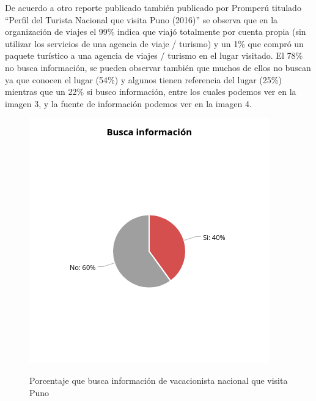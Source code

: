 De acuerdo a otro reporte publicado también publicado por Promperú titulado “Perfil del Turista Nacional que visita Puno (2016)” se observa que en la organización de viajes el 99\% indica que viajó totalmente por cuenta propia (sin utilizar los servicios de una agencia de viaje / turismo) y un 1\% que compró un paquete turístico a una agencia de viajes / turismo en el lugar visitado. El 78\% no busca información, se pueden observar también que muchos de ellos no buscan ya que conocen el lugar (54\%) y algunos tienen referencia del lugar (25\%) mientras que un 22\% si busco información, entre los cuales podemos ver en la imagen 3, y la fuente de información podemos ver en la imagen 4.
\begin{figure}[!ht]
    \centering
    \includegraphics[scale=0.7]{Capitulo2/Figs/busca_informacion_nacional.jpg}
    \caption{Porcentaje que busca información de vacacionista nacional que visita Puno}
    \cite{2017PerfilNacional}
    \label{fig:busca_informacion_nacional}
\end{figure}

